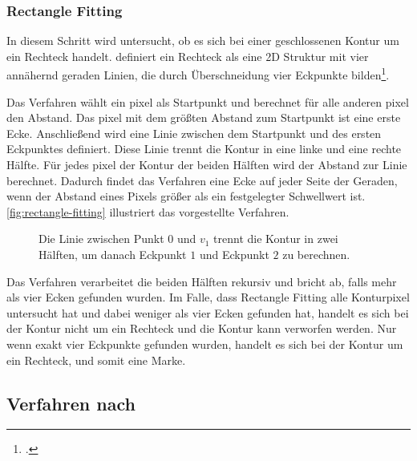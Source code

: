 
\subsubsection{Rectangle Fitting} %
\label{sub:rectangle_fitting}

In diesem Schritt wird untersucht, ob es sich bei einer geschlossenen Kontur um ein Rechteck handelt.
 \citeauthor{wagner07a} definiert ein Rechteck als eine 2D Struktur mit vier annähernd geraden Linien, die durch
 Überschneidung vier Eckpunkte bilden\footcite[Vgl.][S.~42]{wagner07a}.

Das Verfahren wählt ein \gls{pixel} als Startpunkt und berechnet für alle anderen \gls{pixel} den Abstand. Das
 \gls{pixel} mit dem größten Abstand zum Startpunkt ist eine erste Ecke. Anschließend wird eine Linie zwischen dem
 Startpunkt und des ersten Eckpunktes definiert. Diese Linie trennt die Kontur in eine linke und eine rechte Hälfte.
 Für jedes \gls{pixel} der Kontur der beiden Hälften wird der Abstand zur Linie berechnet. Dadurch findet das
 Verfahren eine Ecke auf jeder Seite der Geraden, wenn der Abstand eines Pixels größer als ein festgelegter
 Schwellwert ist. \autoref{fig:rectangle-fitting} illustriert das vorgestellte Verfahren.
\begin{figure}[!ht]
	\centering
	
	\caption{Die Linie zwischen Punkt $0$ und $v_{1}$ trennt die Kontur in zwei Hälften, um danach Eckpunkt $1$ und
	 Eckpunkt $2$ zu berechnen.}
	\label{fig:rectangle-fitting}
\end{figure}
Das Verfahren verarbeitet die beiden Hälften rekursiv und bricht ab, falls mehr als vier Ecken gefunden wurden. Im
 Falle, dass Rectangle Fitting alle Konturpixel untersucht hat und dabei weniger als vier Ecken gefunden hat, handelt
 es sich bei der Kontur nicht um ein Rechteck und die Kontur kann verworfen werden. Nur wenn exakt vier Eckpunkte
 gefunden wurden, handelt es sich bei der Kontur um ein Rechteck, und somit eine Marke.



\subsection{Verfahren nach \texorpdfstring{\citeauthor{hirzer08}}{Hirzer}} %
\label{sub:verfahren_nach_hirzer}

